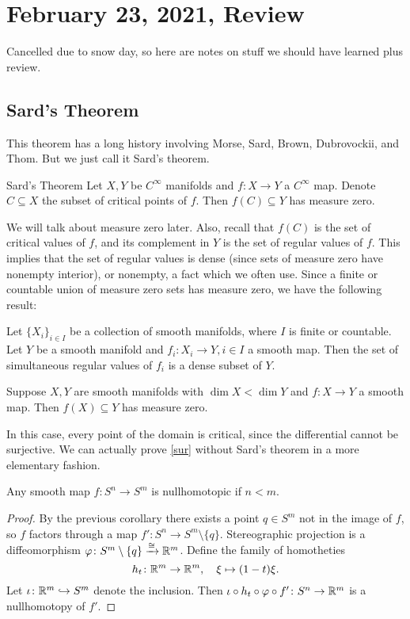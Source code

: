 \section{February 23, 2021, Review}
Cancelled due to snow day, so here are notes on stuff we should have learned plus review.
\subsection{Sard's Theorem}
This theorem has a long history involving Morse, Sard, Brown, Dubrovockii, and Thom. But we just call it Sard's theorem.
\begin{namedthm}{Sard's Theorem}
    Let $X,Y$ be $C^{\infty}$ manifolds and $f \colon X \to Y$ a $C^{\infty}$ map. Denote $C \subseteq X$ the subset of critical points of $f$. Then $f(C) \subseteq Y$ has measure zero. 
\end{namedthm}
We will talk about measure zero later. Also, recall that $f(C)$ is the set of critical values of $f$, and its complement in $Y$ is the set of regular values of $f$. This implies that the set of regular values is dense (since sets of measure zero have nonempty interior), or nonempty, a fact which we often use. Since a finite or countable union of measure zero sets has measure zero, we have the following result:
\begin{cor}
    Let $\{X_i \} _{i \in I}$ be a collection of smooth manifolds, where $I$ is finite or countable.  Let $Y$ be a smooth manifold and $f_i  \colon X_i  \to Y, i \in I$ a smooth map. Then the set of simultaneous regular values of $f_i $ is a dense subset of $Y$.
\end{cor}
\begin{cor}\label{sur}
    Suppose $X,Y$ are smooth manifolds with $\dim X< \dim Y$ and $f \colon X \to Y$ a smooth map. Then $f(X) \subseteq Y$ has measure zero.
\end{cor}
In this case, every point of the domain is critical, since the differential cannot be surjective. We can actually prove \cref{sur} without Sard's theorem in a more elementary fashion.
\begin{cor}
    Any smooth map $f \colon S^n  \to S^m$ is nullhomotopic if $n<m$.
\end{cor}
\begin{proof}
    By the previous corollary there exists a point $q \in S^m$ not in the image of $f$, so $f$ factors through a map $f' \colon S^n  \to S^m \setminus \{q\} $. Stereographic projection is a diffeomorphism $\varphi  \colon S^m \setminus \{q\}  \xrightarrow{\cong} \mathbb{R}^m$. Define the family of homotheties \[
        h_t \colon \mathbb{R}^m \to \mathbb{R}^m,\quad \xi\mapsto (1-t)\xi.
    \] Let $\iota \colon \mathbb{R}^m \hookrightarrow S^m$ denote the inclusion. Then $\iota \circ h_t \circ \varphi  \circ f' \colon S^n  \to \mathbb{R}^m$ is a nullhomotopy of $f'$.
\end{proof}

